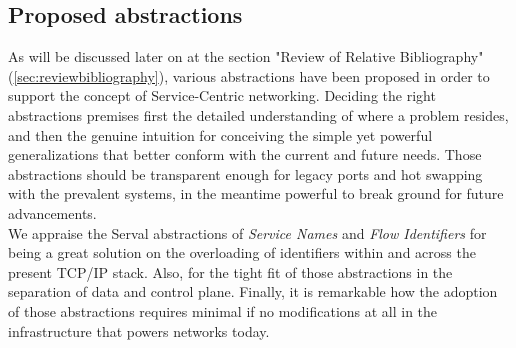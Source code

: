 \subsection{Proposed abstractions}
As will be discussed later on at the section "Review of Relative Bibliography" (\ref{sec:reviewbibliography}), various abstractions have been proposed in order to support the concept of Service-Centric networking.
Deciding the right abstractions premises first the detailed understanding of where a problem resides, and then the genuine intuition for conceiving the simple yet powerful generalizations that better conform with the current and future needs.
Those abstractions should be transparent enough for legacy ports and hot swapping with the prevalent systems, in the meantime powerful to break ground for future advancements.\\
\indent We appraise the Serval abstractions of \emph{Service Names} and \emph{Flow Identifiers} for being a great solution on the overloading of identifiers within and across the present TCP/IP stack.
Also, for the tight fit of those abstractions in the separation of data and control plane.
Finally, it is remarkable how the adoption of those abstractions requires minimal if no modifications at all in the infrastructure that powers networks today.

